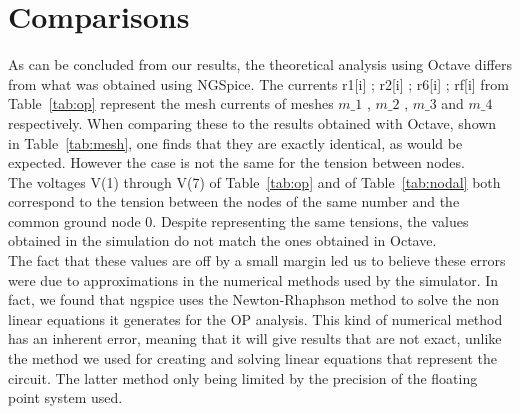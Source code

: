 \section{Comparisons}
\label{sec:comparisons}

As can be concluded from our results, the theoretical analysis using Octave differs from what was obtained using NGSpice. The currents r1[i] ; r2[i] ; r6[i] ; rf[i] from Table~\ref{tab:op} represent the mesh currents of meshes $m\_1$ , $m\_2$ , $m\_3$ and $m\_4$ respectively. When comparing these to the results obtained with Octave, shown in Table~\ref{tab:mesh}, one finds that they are exactly identical, as would be expected. However the case is not the same for the tension between nodes.\\
The voltages V(1) through V(7) of Table~\ref{tab:op} and of Table~\ref{tab:nodal} both correspond to the tension between the nodes of the same number and the common ground node 0. Despite representing the same tensions, the values obtained in the simulation do not match the ones obtained in Octave.\\
The fact that these values are off by a small margin led us to believe these errors were due to approximations in the numerical methods used by the simulator. In fact, we found that ngspice uses the Newton-Rhaphson method \cite{codecs} to solve the non linear equations it generates for the OP analysis. This kind of numerical method has an inherent error, meaning that it will give results that are not exact, unlike the method we used for creating and solving linear equations that represent the circuit. The latter method only being limited by the precision of the floating point system used.
